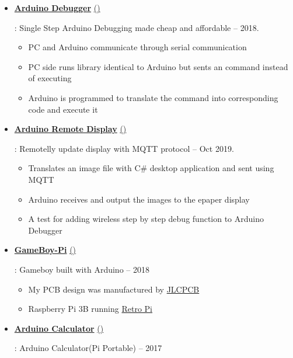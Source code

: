 \documentclass[a4paper]{article}
\def\dashdiv{{%
  \def\sp{0.3em minus 0.1em}%
  \hspace{\sp}%
  \color{black!50!white}%
  --%
  \hspace{\sp}%
}}
\def\ghurl#1{%
    \href{#1}{({\blueghicon{}})}%
  }
\def\githubURL#1#2{%
    \href{#1}{\color{link}\textbf{#2}} \ghurl{#1}
  }
\begin{document}
    \begin{itemize}

        \item \githubURL{https://github.com/RustColeone/ArduinoDebugger}{Arduino Debugger}: Single Step Arduino Debugging made cheap and affordable \dashdiv{} 2018.

        \begin{itemize}
            \item PC and Arduino communicate through serial communication
            \item PC side runs library identical to Arduino but sents an command instead of executing
            \item Arduino is programmed to translate the command into corresponding code and execute it
        \end{itemize}
        \newpage

        \item \githubURL{https://github.com/RustColeone/HardwareProjectArchive/tree/master/ArduinoRemoteDisplay}{Arduino Remote Display}: Remotelly update display with MQTT protocol\dashdiv{} Oct 2019.

        \begin{itemize}
            \item Translates an image file with C\# desktop application and sent using MQTT
            \item Arduino receives and output the images to the epaper display
            \item A test for adding wireless step by step debug function to Arduino Debugger
        \end{itemize}

        \item \githubURL{https://github.com/RustColeone/HardwareProjectArchive/tree/master/GameBoyPi}{GameBoy-Pi}: Gameboy built with Arduino \dashdiv{} 2018

        \begin{itemize}
            \item My PCB design was manufactured by \href{https://jlcpcb.com/}{\color{link}JLCPCB}
            \item Raspberry Pi 3B running \href{https://retropie.org.uk/}{\color{link}Retro Pi}
        \end{itemize}

        \item \githubURL{https://github.com/RustColeone/PiPortable}{Arduino Calculator}: Arduino Calculator(Pi Portable)\dashdiv{} 2017


\end{itemize}
\end{document}

